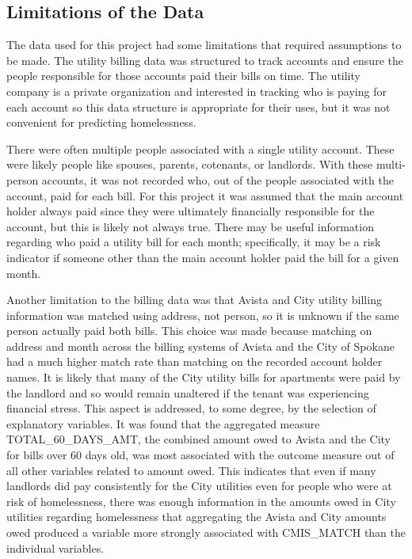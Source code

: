 \documentclass[10pt,letterpaper]{article}
\begin{document}
\subsection*{Limitations of the Data}
The data used for this project had some limitations that required assumptions to be made. The utility billing data was structured to track accounts and ensure the people responsible for those accounts paid their bills on time. The utility company is a private organization and interested in tracking who is paying for each account so this data structure is appropriate for their uses, but it was not convenient for predicting homelessness.

There were often multiple people associated with a single utility account. These were likely people like spouses, parents, cotenants, or landlords. With these multi-person accounts, it was not recorded who, out of the people associated with the account, paid for each bill. For this project it was assumed that the main account holder always paid since they were ultimately financially responsible for the account, but this is likely not always true. There may be useful information regarding who paid a utility bill for each month; specifically, it may be a risk indicator if someone other than the main account holder paid the bill for a given month.

Another limitation to the billing data was that Avista and City utility billing information was matched using address, not person, so it is unknown if the same person actually paid both bills. This choice was made because matching on address and month across the billing systems of Avista and the City of Spokane had a much higher match rate than matching on the recorded account holder names. It is likely that many of the City utility bills for apartments were paid by the landlord and so would remain unaltered if the tenant was experiencing financial stress. This aspect is addressed, to some degree, by the selection of explanatory variables. It was found that the aggregated measure TOTAL\_60\_DAYS\_AMT, the combined amount owed to Avista and the City for bills over 60 days old, was most associated with the outcome measure out of all other variables related to amount owed. This indicates that even if many landlords did pay consistently for the City utilities even for people who were at risk of homelessness, there was enough information in the amounts owed in City utilities regarding homelessness that aggregating the Avista and City amounts owed produced a variable more strongly associated with CMIS\_MATCH than the individual variables.
\end{document}
